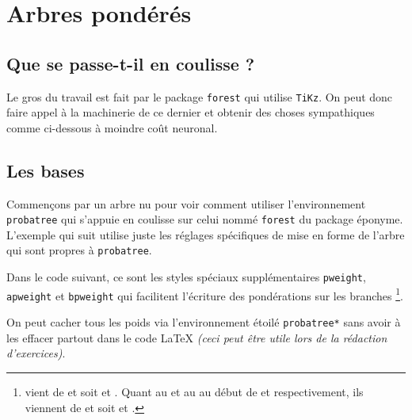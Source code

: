 \documentclass[12pt,a4paper]{article}
\begin{document}
\section{Arbres pondérés}

\subsection{Que se passe-t-il en coulisse ?}

Le gros du travail est fait par le package \verb+forest+ qui utilise \verb+TiKz+. On peut donc faire appel à la machinerie de ce dernier et obtenir des choses sympathiques comme ci-dessous à moindre coût neuronal.





\subsection{Les bases}


Commençons par un arbre nu pour voir comment utiliser l'environnement \verb+probatree+ qui s'appuie en coulisse sur celui nommé \verb+forest+ du package éponyme.
L'exemple qui suit utilise juste les réglages spécifiques de mise en forme de l'arbre qui sont propres à \verb+probatree+.






Dans le code suivant, ce sont les styles spéciaux supplémentaires \verb+pweight+, \verb+apweight+ et \verb+bpweight+ qui facilitent l'écriture des pondérations sur les branches
\footnote{
     vient de  et  soit  et .
    Quant au  et au  au début de  et  respectivement, ils viennent de  et  soit  et .
}.






On peut cacher tous les poids via l'environnement étoilé \verb+probatree*+ sans avoir à les effacer partout dans le code \LaTeX{} \emph{(ceci peut être utile lors de la rédaction d'exercices)}.
\end{document}
